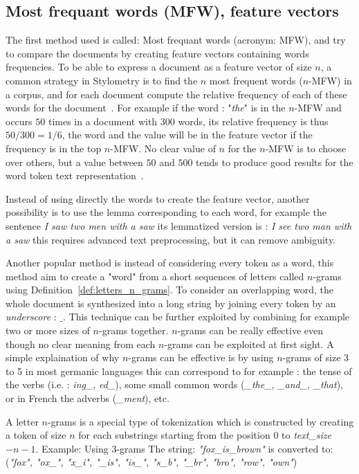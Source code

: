 \subsection{Most frequant words (MFW), feature vectors}

The first method used is called: Most frequant words (acronym: MFW), and try to compare the documents by creating feature vectors containing words frequencies.
To be able to express a document as a feature vector of size $n$, a common strategy in Stylometry is to find the $n$ most frequent words ($n$-MFW) in a corpus, and for each document compute the relative frequency of each of these words for the document~\cite{savoy_stylo}.
For example if the word : "\textit{the}" is in the $n$-MFW and occurs $50$ times in a document with $300$ words, its relative frequency is thus $50/300 = 1/6$, the word and the value will be in the feature vector if the frequency is in the top $n$-MFW.
No clear value of $n$ for the $n$-MFW is to choose over others, but a value between $50$ and $500$ tends to produce good results for the word token text representation~\cite{savoy_text_representation}.

Instead of using directly the words to create the feature vector, another possibility is to use the lemma corresponding to each word, for example the sentence \textit{I saw two men with a saw} its lemmatized version is : \textit{I see two man with a saw} this requires advanced text preprocessing, but it can remove ambiguity.

Another popular method is instead of considering every token as a word, this method aim to create a "word" from a short sequences of letters called $n$-grams using Definition~\ref{def:letters_n_grams}.
To consider an overlapping word, the whole document is synthesized into a long string by joining every token by an \textit{underscore} : $\_$.
This technique can be further exploited by combining for example two or more sizes of $n$-grams together.
$n$-grams can be really effective even though no clear meaning from each $n$-grams can be exploited at first sight.
A simple explaination of why $n$-grams can be effective is by using $n$-grams of size 3 to 5 in most germanic languages this can correspond to for example : the tense of the verbs (i.e. : \textit{ing\_}, \textit{ed\_}), some small common words (\textit{\_the\_}, \textit{\_and\_}, \textit{\_that}), or in French the adverbs (\textit{\_ment}), etc.

\begin{definition}
  \label{def:letters_n_grams}
  A letter $n$-grams is a special type of tokenization which is constructed by creating a token of size $n$ for each substrings starting from the position $0$ to \textit{text\_size} $- n - 1$.
  Example: Using 3-grams The string: \textit{"fox\_is\_brown"} is converted to: (\textit{"fox", "ox\_", "x\_i", "\_is", "is\_", "s\_b", "\_br", "bro", "row", "own"})
\end{definition}

